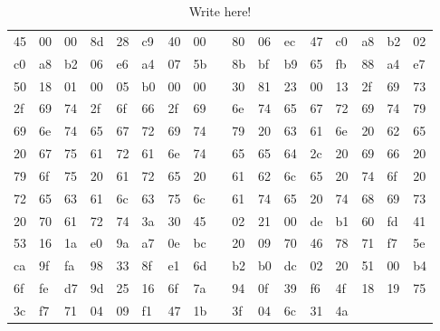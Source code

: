 \begin{table}[]
\centering
\begin{tabular}{lllllllllllllllll}
45 & 00 & 00 & 8d & 28 & c9 & 40 & 00 &  & 80 & 06 & ec & 47 & c0 & a8 & b2 & 02 \\
c0 & a8 & b2 & 06 & e6 & a4 & 07 & 5b &  & 8b & bf & b9 & 65 & fb & 88 & a4 & e7 \\
50 & 18 & 01 & 00 & 05 & b0 & 00 & 00 &  & 30 & 81 & 23 & 00 & 13 & 2f & 69 & 73 \\
2f & 69 & 74 & 2f & 6f & 66 & 2f & 69 &  & 6e & 74 & 65 & 67 & 72 & 69 & 74 & 79 \\
69 & 6e & 74 & 65 & 67 & 72 & 69 & 74 &  & 79 & 20 & 63 & 61 & 6e & 20 & 62 & 65 \\
20 & 67 & 75 & 61 & 72 & 61 & 6e & 74 &  & 65 & 65 & 64 & 2c & 20 & 69 & 66 & 20 \\
79 & 6f & 75 & 20 & 61 & 72 & 65 & 20 &  & 61 & 62 & 6c & 65 & 20 & 74 & 6f & 20 \\
72 & 65 & 63 & 61 & 6c & 63 & 75 & 6c &  & 61 & 74 & 65 & 20 & 74 & 68 & 69 & 73 \\
20 & 70 & 61 & 72 & 74 & 3a & 30 & 45 &  & 02 & 21 & 00 & de & b1 & 60 & fd & 41 \\
53 & 16 & 1a & e0 & 9a & a7 & 0e & bc &  & 20 & 09 & 70 & 46 & 78 & 71 & f7 & 5e \\
ca & 9f & fa & 98 & 33 & 8f & e1 & 6d &  & b2 & b0 & dc & 02 & 20 & 51 & 00 & b4 \\
6f & fe & d7 & 9d & 25 & 16 & 6f & 7a &  & 94 & 0f & 39 & f6 & 4f & 18 & 19 & 75 \\
3c & f7 & 71 & 04 & 09 & f1 & 47 & 1b &  & 3f & 04 & 6c & 31 & 4a &    &    &    \\   
\end{tabular}
\caption{Write here!}
\label{tab:ecc-table}
\end{table}
